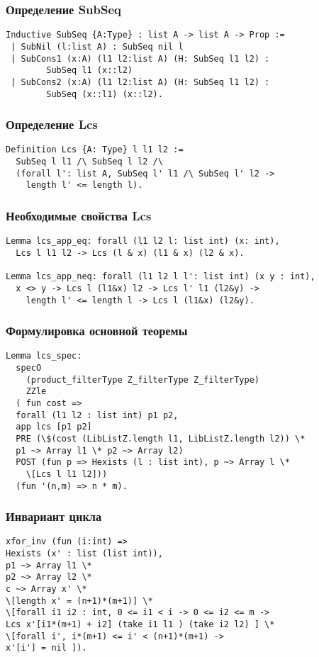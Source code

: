 \documentclass{beamer}
\begin{document}
\begin{frame}[fragile]
	\frametitle{Определение SubSeq}
	\begin{verbatim}
Inductive SubSeq {A:Type} : list A -> list A -> Prop :=
 | SubNil (l:list A) : SubSeq nil l
 | SubCons1 (x:A) (l1 l2:list A) (H: SubSeq l1 l2) : 
 		SubSeq l1 (x::l2)
 | SubCons2 (x:A) (l1 l2:list A) (H: SubSeq l1 l2) : 
 		SubSeq (x::l1) (x::l2).
	\end{verbatim}
\end{frame}

\begin{frame}[fragile]
	\frametitle{Определение Lcs}
	\begin{verbatim}
Definition Lcs {A: Type} l l1 l2 :=
  SubSeq l l1 /\ SubSeq l l2 /\ 
  (forall l': list A, SubSeq l' l1 /\ SubSeq l' l2 -> 
  	length l' <= length l). 
	\end{verbatim}
\end{frame}

\begin{frame}[fragile]
	\frametitle{Необходимые свойства Lcs}
	\begin{verbatim}
Lemma lcs_app_eq: forall (l1 l2 l: list int) (x: int),
  Lcs l l1 l2 -> Lcs (l & x) (l1 & x) (l2 & x). 

Lemma lcs_app_neq: forall (l1 l2 l l': list int) (x y : int),
  x <> y -> Lcs l (l1&x) l2 -> Lcs l' l1 (l2&y) -> 
  	length l' <= length l -> Lcs l (l1&x) (l2&y). 
	\end{verbatim}
\end{frame}

\begin{frame}[fragile]
	\frametitle{Формулировка основной теоремы}
	\begin{verbatim}
Lemma lcs_spec:
  specO
    (product_filterType Z_filterType Z_filterType)
    ZZle
  ( fun cost =>
  forall (l1 l2 : list int) p1 p2,
  app lcs [p1 p2]
  PRE (\$(cost (LibListZ.length l1, LibListZ.length l2)) \*
  p1 ~> Array l1 \* p2 ~> Array l2)
  POST (fun p => Hexists (l : list int), p ~> Array l \* 
  	\[Lcs l l1 l2]))
  (fun '(n,m) => n * m).
	\end{verbatim}
\end{frame}

\begin{frame}[fragile]
	\frametitle{Инвариант цикла}
	\begin{verbatim}
xfor_inv (fun (i:int) => 
Hexists (x' : list (list int)),
p1 ~> Array l1 \*
p2 ~> Array l2 \*
c ~> Array x' \*
\[length x' = (n+1)*(m+1)] \*
\[forall i1 i2 : int, 0 <= i1 < i -> 0 <= i2 <= m -> 
Lcs x'[i1*(m+1) + i2] (take i1 l1 ) (take i2 l2) ] \* 
\[forall i', i*(m+1) <= i' < (n+1)*(m+1) ->
x'[i'] = nil ]). 
	\end{verbatim}
\end{frame}
\end{document}
